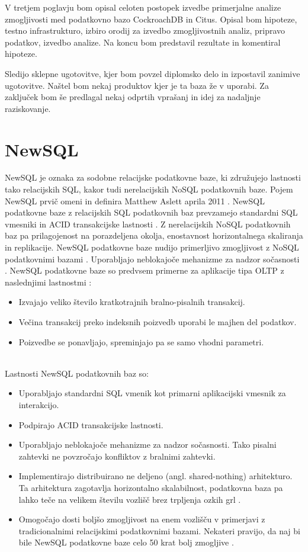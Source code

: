 \documentclass[a4paper, 12pt]{book}
\begin{document}
V tretjem poglavju bom opisal celoten postopek izvedbe primerjalne analize zmogljivosti med podatkovno bazo CockroachDB in Citus. Opisal bom hipoteze, testno infrastrukturo, izbiro orodij za izvedbo zmogljivostnih analiz, pripravo podatkov, izvedbo analize. Na koncu bom predstavil rezultate in komentiral hipoteze.

Sledijo sklepne ugotovitve, kjer bom povzel diplomsko delo in izpostavil zanimive ugotovitve. Naštel bom nekaj produktov kjer je ta baza že v uporabi. Za zaključek bom še predlagal nekaj odprtih vprašanj in idej za nadaljnje raziskovanje.


\chapter{NewSQL}
NewSQL je oznaka za sodobne relacijske podatkovne baze, ki združujejo lastnosti tako relacijskih SQL, kakor tudi nerelacijskih NoSQL podatkovnih baze. Pojem NewSQL prvič omeni in definira Matthew Aslett aprila 2011 \cite{Pavlo2016Sep}. NewSQL podatkovne baze z relacijskih SQL podatkovnih baz prevzamejo standardni SQL vmesniki in ACID transakcijske lastnosti \cite{oliveira2017newsql}. Z nerelacijskih NoSQL podatkovnih baz pa prilagojenost na porazdeljena okolja, enostavnost horizontalnega skaliranja in replikacije. NewSQL podatkovne baze nudijo primerljivo zmogljivost z NoSQL podatkovnimi bazami \cite{oliveira2017newsql}. Uporabljajo neblokajoče mehanizme za nadzor sočasnosti \cite{NewSQLNewWayToHandleBigData}. NewSQL podatkovne baze so predvsem primerne za aplikacije tipa OLTP z naslednjimi lastnostmi \cite{Pavlo2016Sep}:
\begin{itemize}
    \item Izvajajo veliko število kratkotrajnih bralno-pisalnih transakcij.
    \item Večina transakcij preko indeksnih poizvedb uporabi le majhen del podatkov.
    \item Poizvedbe se ponavljajo, spreminjajo pa se samo vhodni parametri.
\end{itemize}

\ \\
Lastnosti NewSQL podatkovnih baz so:
\begin{itemize}
    \item Uporabljajo standardni SQL vmenik kot primarni aplikacijski vmesnik za interakcijo.
    \item Podpirajo ACID transakcijske lastnosti.
    \item Uporabljajo neblokajoče mehanizme za nadzor sočasnosti. Tako pisalni zahtevki ne povzročajo konfliktov z bralnimi zahtevki.
    \item Implementirajo distribuirano ne deljeno (angl. shared-nothing) arhitekturo. Ta arhitektura zagotavlja horizontalno skalabilnost, podatkovna baza pa lahko teče na velikem številu vozlišč brez trpljenja ozkih grl \cite{NewSQLNewWayToHandleBigData}.
    \item Omogočajo dosti boljšo zmogljivost na enem vozlišču v primerjavi z tradicionalnimi relacijskimi podatkovnimi bazami. Nekateri pravijo, da naj bi bile NewSQL podatkovne baze celo 50 krat bolj zmogljive \cite{Kumar2018Jun}.
\end{itemize}
\end{document}
